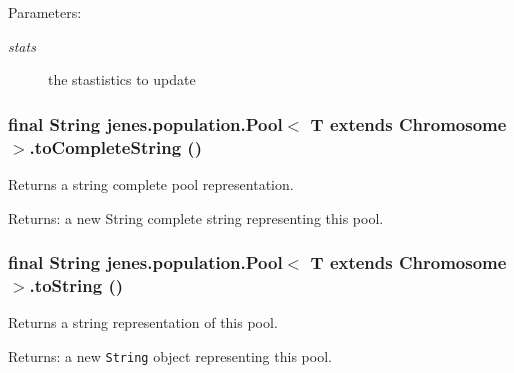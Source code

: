 \begin{Desc}
\item[Parameters:]
\begin{description}
\item[{\em stats}]the stastistics to update \end{description}
\end{Desc}
\hypertarget{classjenes_1_1population_1_1_pool_3_01_t_01extends_01_chromosome_01_4_cedbe69e9804076bc546d97925a9d3bb}{
\subsubsection[toCompleteString]{\setlength{\rightskip}{0pt plus 5cm}final String jenes.population.Pool$<$ T extends Chromosome $>$.toCompleteString ()}}
\label{classjenes_1_1population_1_1_pool_3_01_t_01extends_01_chromosome_01_4_cedbe69e9804076bc546d97925a9d3bb}


Returns a string complete pool representation. 

\begin{Desc}
\item[Returns:]a new String complete string representing this pool. \end{Desc}
\hypertarget{classjenes_1_1population_1_1_pool_3_01_t_01extends_01_chromosome_01_4_f44d9f24db7bd43df43ceb1098146d0c}{
\subsubsection[toString]{\setlength{\rightskip}{0pt plus 5cm}final String jenes.population.Pool$<$ T extends Chromosome $>$.toString ()}}
\label{classjenes_1_1population_1_1_pool_3_01_t_01extends_01_chromosome_01_4_f44d9f24db7bd43df43ceb1098146d0c}


Returns a string representation of this pool. 

\begin{Desc}
\item[Returns:]a new {\tt String} object representing this pool. \end{Desc}


